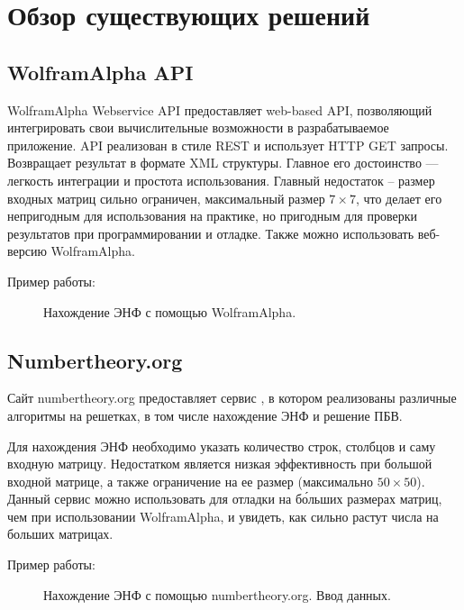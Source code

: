 \newpage

\section{Обзор существующих решений}

\subsection{WolframAlpha API}

WolframAlpha Webservice API \cite{WolframAlpha} предоставляет web-based API, позволяющий интегрировать свои вычислительные возможности в разрабатываемое приложение. API реализован в стиле REST и использует HTTP GET запросы. Возвращает результат в формате XML структуры. Главное его достоинство --- легкость интеграции и простота использования. Главный недостаток -- размер входных матриц сильно ограничен, максимальный размер $ 7 \times 7 $, что делает его непригодным для использования на практике, но пригодным для проверки результатов при программировании и отладке. Также можно использовать веб-версию WolframAlpha.

Пример работы:

\begin{figure}[H]
\caption{Нахождение ЭНФ с помощью WolframAlpha.}
\label{fig:HNF_WA}
\end{figure}

\subsection{Numbertheory.org}

Сайт numbertheory.org предоставляет сервис \cite{NumberTheory}, в котором реализованы различные алгоритмы на решетках, в том числе нахождение ЭНФ и решение ПБВ. 

Для нахождения ЭНФ необходимо указать количество строк, столбцов и саму входную матрицу. Недостатком является низкая эффективность при большой входной матрице, а также ограничение на ее размер (максимально $ 50 \times 50 $). Данный сервис можно использовать для отладки на б\'ольших размерах матриц, чем при использовании WolframAlpha, и увидеть, как сильно растут числа на больших матрицах.

Пример работы:

\begin{figure}[H]
\caption{Нахождение ЭНФ с помощью numbertheory.org. Ввод данных.}
\label{fig:HNF_NT_INPUT}
\end{figure}

